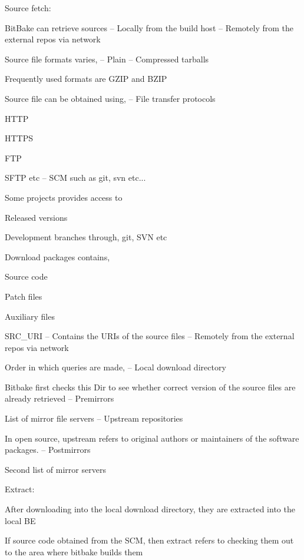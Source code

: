 \begin{DoxyItemize}
\begin{DoxyEnumerate}
\end{DoxyEnumerate}
\item Source fetch\+:
\begin{DoxyItemize}
\item Bit\+Bake can retrieve sources – Locally from the build host – Remotely from the external repos via network
\item Source file formats varies, – Plain – Compressed tarballs
\begin{DoxyItemize}
\item Frequently used formats are G\+Z\+IP and B\+Z\+IP
\end{DoxyItemize}
\item Source file can be obtained using, – File transfer protocols
\begin{DoxyItemize}
\item H\+T\+TP
\item H\+T\+T\+PS
\item F\+TP
\item S\+F\+TP etc – S\+CM such as git, svn etc...
\end{DoxyItemize}
\item Some projects provides access to
\begin{DoxyItemize}
\item Released versions
\item Development branches through, git, S\+VN etc
\end{DoxyItemize}
\item Download packages contains,
\begin{DoxyItemize}
\item Source code
\item Patch files
\item Auxiliary files
\end{DoxyItemize}
\item S\+R\+C\+\_\+\+U\+RI – Contains the U\+RI\textquotesingle{}s of the source files – Remotely from the external repos via network
\item Order in which queries are made, – Local download directory
\begin{DoxyItemize}
\item Bitbake first checks this Dir to see whether correct version of the source files are already retrieved – Premirrors
\item List of mirror file servers – Upstream repositories
\item In open source, upstream refers to original authors or maintainers of the software packages. – Postmirrors
\item Second list of mirror servers
\end{DoxyItemize}
\end{DoxyItemize}
\item Extract\+:
\begin{DoxyItemize}
\item After downloading into the local download directory, they are extracted into the local BE
\item If source code obtained from the S\+CM, then extract refers to checking them out to the area where bitbake builds them ~\newline


\end{DoxyItemize}
\end{DoxyItemize}
